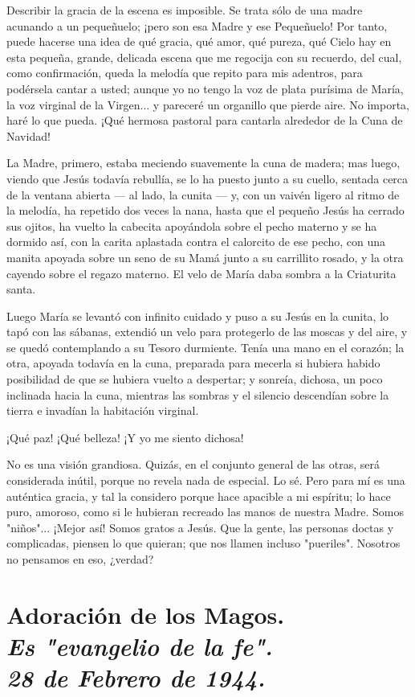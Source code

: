\documentclass[12pt, twoside, openright]{book} %
\begin{document}
Describir la gracia de la escena es imposible. Se trata sólo de una madre acunando a un pequeñuelo; ¡pero son esa Madre y ese Pequeñuelo! Por tanto, puede hacerse una idea de qué gracia, qué amor, qué pureza, qué Cielo hay en esta pequeña, grande, delicada escena que me regocija con su recuerdo, del cual, como confirmación, queda la melodía que repito para mis adentros, para podérsela cantar a usted; aunque yo no tengo la voz de plata purísima de María, la voz virginal de la Virgen... y pareceré un organillo que pierde aire. No importa, haré lo que pueda. ¡Qué hermosa pastoral para cantarla alrededor de la Cuna de Navidad! 

La Madre, primero, estaba meciendo suavemente la cuna de madera; mas luego, viendo que Jesús todavía rebullía, se lo ha puesto junto a su cuello, sentada cerca de la ventana abierta — al lado, la cunita — y, con un vaivén ligero al ritmo de la melodía, ha repetido dos veces la nana, hasta que el pequeño Jesús ha cerrado sus ojitos, ha vuelto la cabecita apoyándola sobre el pecho materno y se ha dormido así, con la carita aplastada contra el calorcito de ese pecho, con una manita apoyada sobre un seno de su Mamá junto a su carrillito rosado, y la otra cayendo sobre el regazo materno. El velo de María daba sombra a la Criaturita santa. 

Luego María se levantó con infinito cuidado y puso a su Jesús en la cunita, lo tapó con las sábanas, extendió un velo para protegerlo de las moscas y del aire, y se quedó contemplando a su Tesoro durmiente. Tenía una mano en el corazón; la otra, apoyada todavía en la cuna, preparada para mecerla si hubiera habido posibilidad de que se hubiera vuelto a despertar; y sonreía, dichosa, un poco inclinada hacia la cuna, mientras las sombras y el silencio descendían sobre la tierra e invadían la habitación virginal. 

¡Qué paz! ¡Qué belleza! ¡Y yo me siento dichosa! 

No es una visión grandiosa. Quizás, en el conjunto general de las otras, será considerada inútil, porque no revela nada de especial. Lo sé. Pero para mí es una auténtica gracia, y tal la considero porque hace apacible a mi espíritu; lo hace puro, amoroso, como si le hubieran recreado las manos de nuestra Madre. Somos "niños"... ¡Mejor así! Somos gratos a Jesús. Que la gente, las personas doctas y complicadas, piensen lo que quieran; que nos llamen incluso "pueriles". Nosotros no pensamos en eso, ¿verdad? 

\chapter*{Adoración de los Magos. \\ \normalfont\normalsize\textit{Es "evangelio de la fe". \\ 28 de Febrero de 1944.}}
\end{document}
